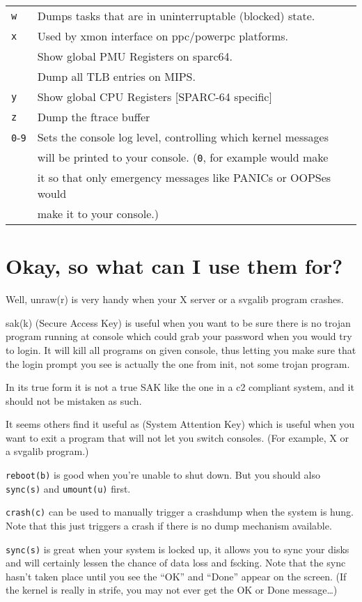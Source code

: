 \documentclass[article,letterpaper]{memoir}
\let\subsection\section
\let\section\chapter
\begin{document}
\begin{longtable}[]{@{}ll@{}}
\texttt{w} & Dumps tasks that are in uninterruptable (blocked)
state.\tabularnewline
\texttt{x} & Used by xmon interface on ppc/powerpc
platforms.\tabularnewline
& Show global PMU Registers on sparc64.\tabularnewline
& Dump all TLB entries on MIPS.\tabularnewline
\texttt{y} & Show global CPU Registers {[}SPARC-64
specific{]}\tabularnewline
\texttt{z} & Dump the ftrace buffer\tabularnewline
\texttt{0}-\texttt{9} & Sets the console log level, controlling which
kernel messages\tabularnewline
& will be printed to your console. (\texttt{0}, for example would
make\tabularnewline
& it so that only emergency messages like PANICs or OOPSes
would\tabularnewline
& make it to your console.)\tabularnewline
\bottomrule
\end{longtable}

\clearpage
\subsection{Okay, so what can I use them
for?}\label{okay-so-what-can-i-use-them-for}

Well, unraw(r) is very handy when your X server or a svgalib program
crashes.

sak(k) (Secure Access Key) is useful when you want to be sure there is
no trojan program running at console which could grab your password when
you would try to login. It will kill all programs on given console, thus
letting you make sure that the login prompt you see is actually the one
from init, not some trojan program.

In its true form it is not a true SAK like the one in a c2 compliant
system, and it should not be mistaken as such.

It seems others find it useful as (System Attention Key) which is useful
when you want to exit a program that will not let you switch consoles.
(For example, X or a svgalib program.)

\texttt{reboot(b)} is good when you're unable to shut down. But you
should also \texttt{sync(s)} and \texttt{umount(u)} first.

\texttt{crash(c)} can be used to manually trigger a crashdump when the
system is hung. Note that this just triggers a crash if there is no dump
mechanism available.

\texttt{sync(s)} is great when your system is locked up, it allows you
to sync your disks and will certainly lessen the chance of data loss and
fscking. Note that the sync hasn't taken place until you see the ``OK''
and ``Done'' appear on the screen. (If the kernel is really in strife,
you may not ever get the OK or Done message\ldots{})
\end{document}

